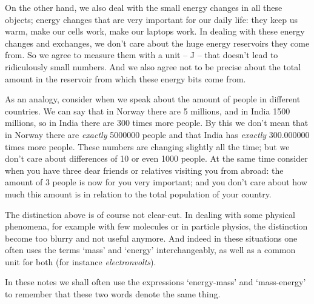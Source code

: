 \documentclass[a4paper,12pt,%
onecolumn,oneside,titlepage,%
british%
]{memoir}
\providecommand{\href}[2]{#2}
\newcommand*{\furl}[2]{\href{#1}{#2}\pagenote{\url{#1}}}
\renewcommand*{\|}[1][]{\nonscript\:#1\vert\nonscript\:\mathopen{}}
\newcommand*{\energym}{energy-mass}
\newcommand*{\masse}{mass-energy}
\begin{document}
On the other hand, we also deal with the small energy changes in all these objects; energy changes that are very important for our daily life: they keep us warm, make our cells work, make our laptops work. In dealing with these energy changes and exchanges, we don't care about the huge energy reservoirs they come from. So we agree to measure them with a unit -- \unit{J} -- that doesn't lead to ridiculously small numbers. And we also agree not to be precise about the total amount in the reservoir from which these energy bits come from.

As an analogy, consider when we speak about the amount of people in different countries. We can say that in Norway there are \num{5} millions, and in India \num{1500} millions, so in India there are \num{300} times more people. By this we don't mean that in Norway there are \emph{exactly} \num{5000000} people and that India has \emph{exactly} \num{300.000000} times more people. These numbers are changing slightly all the time; but we don't care about differences of 10 or even 1000 people. At the same time consider when you have three dear friends or relatives visiting you from abroad: the amount of \num{3} people is now for you very important; and you don't care about how much this amount is in relation to the total population of your country.

\smallskip

The distinction above is of course not clear-cut. In dealing with some physical phenomena, for example with few molecules or in particle physics, the distinction become too blurry and not useful anymore. And indeed in these situations one often uses the terms \enquote*{mass} and \enquote*{energy} interchangeably, as well as a common unit for both (for instance \furl{https://home.cern/tags/13-tev}{\emph{electronvolts}}).

\medskip

In these notes we shall often use the expressions \enquote*{\energym} and \enquote*{\masse} to remember that these two words denote the same thing.
\end{document}
